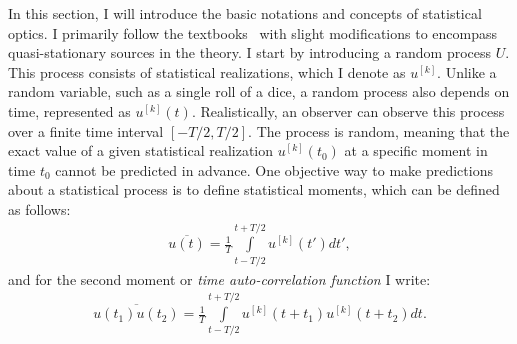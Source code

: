     In this section, I will introduce the basic notations and concepts of statistical optics. I primarily follow the textbooks~\cite{mandel_optical_1995, goodman_statistical_2015} with slight modifications to encompass quasi-stationary sources in the theory. I start by introducing a random process $U$. This process consists of statistical realizations, which I denote as $u^{[k]}$. Unlike a random variable, such as a single roll of a dice, a random process also depends on time, represented as $u^{[k]}(t)$. Realistically, an observer can observe this process over a finite time interval $[-T/2, T/2]$. The process is random, meaning that the exact value of a given statistical realization $u^{[k]}(t_0)$ at a specific moment in time $t_0$ cannot be predicted in advance. One objective way to make predictions about a statistical process is to define statistical moments, which can be defined as follows:
    \begin{align}
        \overline{u(t)} = \frac{1}{T} \int \limits_{t - T/2}^{t + T/2}  u^{[k]}(t') dt',
        \label{Eq:time_avr}
    \end{align}
    and for the second moment or \textit{time auto-correlation function} I write:
    \begin{align}
        \overline{u(t_1)u(t_2)} = \frac{1}{T} \int \limits_{t - T/2}^{t + T/2} u^{[k]}(t + t_1)u^{[k]}(t + t_2)dt.
        \label{Eq:time_autocorrelation}
    \end{align}
    
